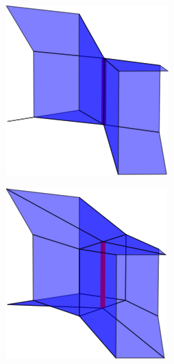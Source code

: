 \begin{figure}
\label{fig:manifoldResolution2D}
\end{figure}

\begin{figure}
\begin{center}
\begin{subfigure}[b]{.45\textwidth}
\centering
\includegraphics[height = .17\textheight, width = .5\textwidth,keepaspectratio]{Pictures/SurfaceReconstruction/3DManifoldOO}
\end{subfigure}
\begin{subfigure}[b]{.45\textwidth}
\centering
\includegraphics[height = .17\textheight, width = .5\textwidth,keepaspectratio]{Pictures/SurfaceReconstruction/3DManifoldOORes}
\end{subfigure}
\begin{subfigure}[b]{.45\textwidth}
\centering

\end{subfigure}
\end{center}
\end{figure}
